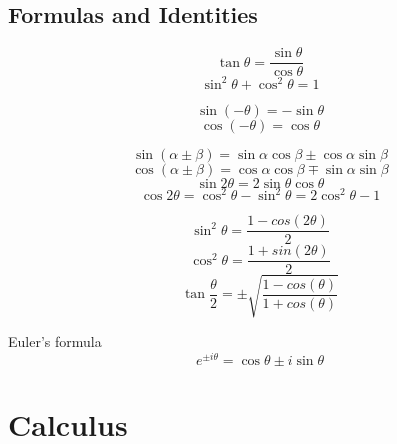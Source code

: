 \documentclass{article}
\begin{document}
	\subsection{Formulas and Identities}
		\begin{equation}
			\tan \theta = \frac{\sin \theta}{\cos \theta}
		\end{equation}
		\begin{equation}
			\sin^2 \theta + \cos^2 \theta = 1
		\end{equation}
		
		\begin{equation}
			\sin(-\theta) = - \sin \theta 
		\end{equation}
		\begin{equation}
			\cos(-\theta) = \cos \theta 
		\end{equation}
		
		\begin{equation}
			\sin \left( {\alpha \pm \beta} \right) = \sin \alpha \cos \beta \pm \cos \alpha \sin \beta
		\end{equation}
		\begin{equation}
			\cos \left( {\alpha \pm \beta } \right) = \cos \alpha \cos \beta \mp \sin \alpha \sin \beta
		\end{equation}
		\begin{equation}
			\sin 2\theta = 2\sin \theta \cos \theta
		\end{equation}
		\begin{equation}
			\cos 2\theta = \cos ^2 \theta - \sin ^2 \theta = 2\cos ^2 \theta - 1
		\end{equation}

		\begin{equation}
			\sin ^2 \theta = \frac{1-cos(2\theta)}{2}
		\end{equation}		
		\begin{equation}
			\cos ^2 \theta = \frac{1+sin(2\theta)}{2}
		\end{equation}
		\begin{equation}
			\tan \frac{\theta}{2} = \pm \sqrt{\frac{1-cos(\theta)}{1+cos(\theta)}}
		\end{equation}
		
		Euler's formula		
		\begin{equation}
			e^{ \pm i\theta } = \cos \theta \pm i\sin \theta
		\end{equation}
\section{Calculus}
\end{document}
